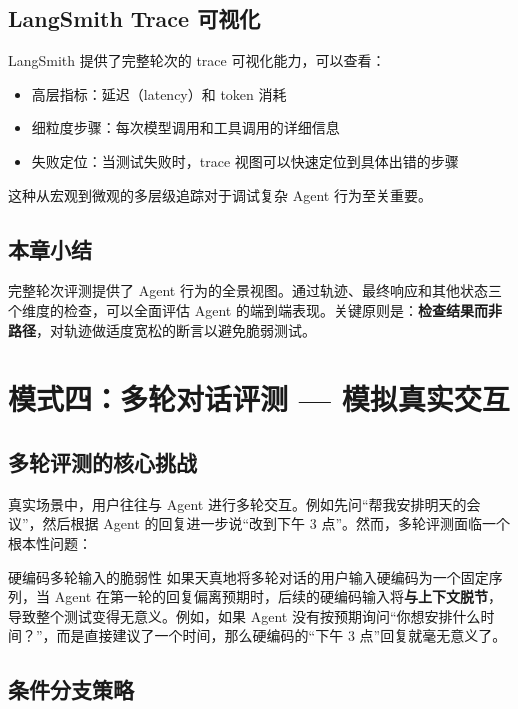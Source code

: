 \documentclass[a4paper]{article}
\begin{document}
\subsection{LangSmith Trace 可视化}

LangSmith 提供了完整轮次的 trace 可视化能力，可以查看：

\begin{itemize}
  \item 高层指标：延迟（latency）和 token 消耗
  \item 细粒度步骤：每次模型调用和工具调用的详细信息
  \item 失败定位：当测试失败时，trace 视图可以快速定位到具体出错的步骤
\end{itemize}

这种从宏观到微观的多层级追踪对于调试复杂 Agent 行为至关重要。

\subsection{本章小结}

完整轮次评测提供了 Agent 行为的全景视图。通过轨迹、最终响应和其他状态三个维度的检查，可以全面评估 Agent 的端到端表现。关键原则是：\textbf{检查结果而非路径}，对轨迹做适度宽松的断言以避免脆弱测试。


\section{模式四：多轮对话评测 --- 模拟真实交互}

\subsection{多轮评测的核心挑战}

真实场景中，用户往往与 Agent 进行多轮交互。例如先问``帮我安排明天的会议''，然后根据 Agent 的回复进一步说``改到下午 3 点''。然而，多轮评测面临一个根本性问题：

\begin{warningbox}{硬编码多轮输入的脆弱性}
如果天真地将多轮对话的用户输入硬编码为一个固定序列，当 Agent 在第一轮的回复偏离预期时，后续的硬编码输入将\textbf{与上下文脱节}，导致整个测试变得无意义。例如，如果 Agent 没有按预期询问``你想安排什么时间？''，而是直接建议了一个时间，那么硬编码的``下午 3 点''回复就毫无意义了。
\end{warningbox}

\subsection{条件分支策略}
\end{document}
